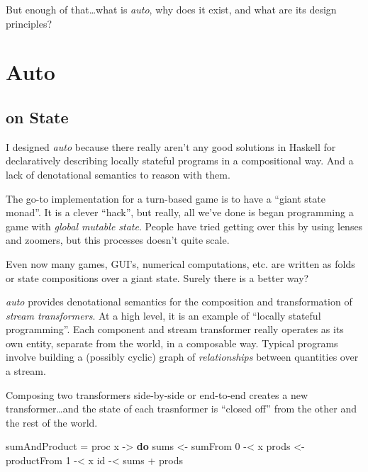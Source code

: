 \documentclass[]{article}
\newenvironment{Shaded}{}{}
\newcommand{\KeywordTok}[1]{\textcolor[rgb]{0.00,0.44,0.13}{\textbf{{#1}}}}
\newcommand{\DecValTok}[1]{\textcolor[rgb]{0.25,0.63,0.44}{{#1}}}
\newcommand{\OtherTok}[1]{\textcolor[rgb]{0.00,0.44,0.13}{{#1}}}
\newcommand{\FunctionTok}[1]{\textcolor[rgb]{0.02,0.16,0.49}{{#1}}}
\newcommand{\NormalTok}[1]{{#1}}
\begin{document}
But enough of that\ldots{}what is \emph{auto}, why does it exist, and
what are its design principles?

\section{Auto}\label{auto}

\subsection{on State}\label{on-state}

I designed \emph{auto} because there really aren't any good solutions in
Haskell for declaratively describing locally stateful programs in a
compositional way. And a lack of denotational semantics to reason with
them.

The go-to implementation for a turn-based game is to have a ``giant
state monad''. It is a clever ``hack'', but really, all we've done is
began programming a game with \emph{global mutable state}. People have
tried getting over this by using lenses and zoomers, but this processes
doesn't quite scale.

Even now many games, GUI's, numerical computations, etc. are written as
folds or state compositions over a giant state. Surely there is a better
way?

\emph{auto} provides denotational semantics for the composition and
transformation of \emph{stream transformers}. At a high level, it is an
example of ``locally stateful programming''. Each component and stream
transformer really operates as its own entity, separate from the world,
in a composable way. Typical programs involve building a (possibly
cyclic) graph of \emph{relationships} between quantities over a stream.

Composing two transformers side-by-side or end-to-end creates a new
transformer\ldots{}and the state of each trasnformer is ``closed off''
from the other and the rest of the world.

\begin{Shaded}
\begin{Highlighting}[]
\NormalTok{sumAndProduct }\FunctionTok{=} \NormalTok{proc x }\OtherTok{->} \KeywordTok{do}
    \NormalTok{sums  }\OtherTok{<-} \NormalTok{sumFrom }\DecValTok{0}     \FunctionTok{-<} \NormalTok{x}
    \NormalTok{prods }\OtherTok{<-} \NormalTok{productFrom }\DecValTok{1} \FunctionTok{-<} \NormalTok{x}
    \NormalTok{id }\FunctionTok{-<} \NormalTok{sums }\FunctionTok{+} \NormalTok{prods}
\end{Highlighting}
\end{Shaded}
\end{document}
